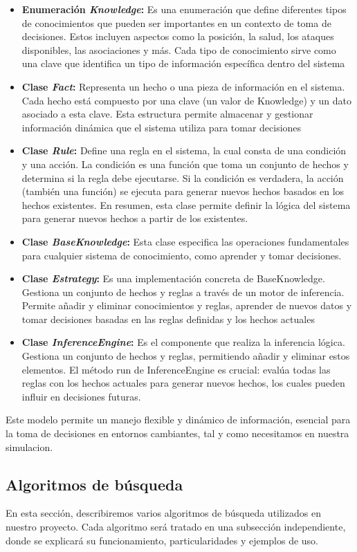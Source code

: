 \documentclass[11pt]{article}
\begin{document}
\begin{itemize}
    \item \textbf{Enumeración \textit{Knowledge}:} Es una enumeración que define diferentes tipos de conocimientos que pueden ser importantes en un contexto de toma de decisiones. Estos incluyen aspectos como la posición, la salud, los ataques disponibles, las asociaciones y más. Cada tipo de conocimiento sirve como una clave que identifica un tipo de información específica dentro del sistema
    \item \textbf{Clase \textit{Fact}:}  Representa un hecho o una pieza de información en el sistema. Cada hecho está compuesto por una clave (un valor de Knowledge) y un dato asociado a esta clave. Esta estructura permite almacenar y gestionar información dinámica que el sistema utiliza para tomar decisiones
    \item \textbf{Clase \textit{Rule}:}  Define una regla en el sistema, la cual consta de una condición y una acción. La condición es una función que toma un conjunto de hechos y determina si la regla debe ejecutarse. Si la condición es verdadera, la acción (también una función) se ejecuta para generar nuevos hechos basados en los hechos existentes. En resumen, esta clase permite definir la lógica del sistema para generar nuevos hechos a partir de los existentes.
    \item \textbf{Clase \textit{BaseKnowledge}:} Esta clase especifica las operaciones fundamentales para cualquier sistema de conocimiento, como aprender y tomar decisiones.
    \item \textbf{Clase \textit{Estrategy}:} Es una implementación concreta de BaseKnowledge. Gestiona un conjunto de hechos y reglas a través de un motor de inferencia. Permite añadir y eliminar conocimientos y reglas, aprender de nuevos datos y tomar decisiones basadas en las reglas definidas y los hechos actuales
    \item \textbf{Clase \textit{InferenceEngine}:} Es el componente que realiza la inferencia lógica. Gestiona un conjunto de hechos y reglas, permitiendo añadir y eliminar estos elementos. El método run de InferenceEngine es crucial: evalúa todas las reglas con los hechos actuales para generar nuevos hechos, los cuales pueden influir en decisiones futuras.
\end{itemize}

Este modelo permite un manejo flexible y dinámico de información, esencial para la toma de decisiones en entornos cambiantes, tal y como necesitamos en nuestra simulacion.
\subsection{Algoritmos de búsqueda}
En esta sección, describiremos varios algoritmos de búsqueda utilizados en nuestro proyecto. Cada algoritmo será tratado en una subsección independiente, donde se explicará su funcionamiento, particularidades y ejemplos de uso.
\end{document}
